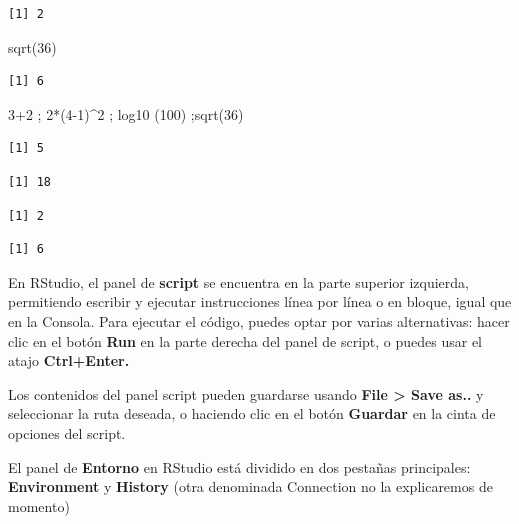 \documentclass[
  letterpaper,
]{scrbook}
\newenvironment{Shaded}{\begin{snugshade}}{\end{snugshade}}
\newcommand{\DecValTok}[1]{\textcolor[rgb]{0.68,0.00,0.00}{#1}}
\newcommand{\FunctionTok}[1]{\textcolor[rgb]{0.28,0.35,0.67}{#1}}
\newcommand{\NormalTok}[1]{\textcolor[rgb]{0.00,0.23,0.31}{#1}}
\newcommand{\SpecialCharTok}[1]{\textcolor[rgb]{0.37,0.37,0.37}{#1}}
\begin{document}
\begin{verbatim}
[1] 2
\end{verbatim}

\begin{Shaded}
\begin{Highlighting}[]
\FunctionTok{sqrt}\NormalTok{(}\DecValTok{36}\NormalTok{)}
\end{Highlighting}
\end{Shaded}

\begin{verbatim}
[1] 6
\end{verbatim}

\begin{Shaded}
\begin{Highlighting}[]
\DecValTok{3}\SpecialCharTok{+}\DecValTok{2}\NormalTok{ ; }\DecValTok{2}\SpecialCharTok{*}\NormalTok{(}\DecValTok{4{-}1}\NormalTok{)}\SpecialCharTok{\^{}}\DecValTok{2}\NormalTok{ ; }\FunctionTok{log10}\NormalTok{ (}\DecValTok{100}\NormalTok{) ;}\FunctionTok{sqrt}\NormalTok{(}\DecValTok{36}\NormalTok{)}
\end{Highlighting}
\end{Shaded}

\begin{verbatim}
[1] 5
\end{verbatim}

\begin{verbatim}
[1] 18
\end{verbatim}

\begin{verbatim}
[1] 2
\end{verbatim}

\begin{verbatim}
[1] 6
\end{verbatim}

En RStudio, el panel de \textbf{script} se encuentra en la parte
superior izquierda, permitiendo escribir y ejecutar instrucciones línea
por línea o en bloque, igual que en la Consola. Para ejecutar el código,
puedes optar por varias alternativas: hacer clic en el botón
\textbf{Run} en la parte derecha del panel de script, o puedes usar el
atajo \textbf{Ctrl+Enter.}

Los contenidos del panel script pueden guardarse usando \textbf{File
\textgreater{} Save as..} y seleccionar la ruta deseada, o haciendo clic
en el botón \textbf{Guardar} en la cinta de opciones del script.

El panel de \textbf{Entorno} en RStudio está dividido en dos pestañas
principales: \textbf{Environment} y \textbf{History} (otra denominada
Connection no la explicaremos de momento)
\end{document}
